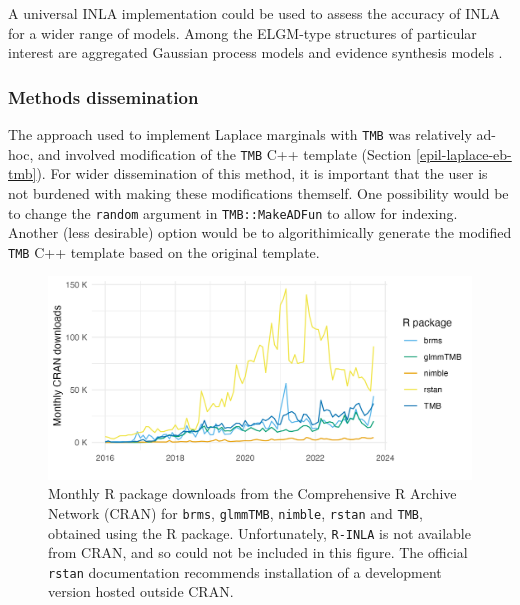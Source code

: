 \documentclass[a4paper, nobind]{templates/ociamthesis}
\begin{document}
A universal INLA implementation could be used to assess the accuracy of INLA for a wider range of models.
Among the ELGM-type structures of particular interest are aggregated Gaussian process models \autocite{nandi2023disaggregation} and evidence synthesis models \autocite{amoah2020geostatistical}.

\hypertarget{methods-dissemination}{%
\subsubsection{Methods dissemination}\label{methods-dissemination}}

The approach used to implement Laplace marginals with \texttt{TMB} was relatively ad-hoc, and involved modification of the \texttt{TMB} C++ template (Section \ref{epil-laplace-eb-tmb}).
For wider dissemination of this method, it is important that the user is not burdened with making these modifications themself.
One possibility would be to change the \texttt{random} argument in \texttt{TMB::MakeADFun} to allow for indexing.
Another (less desirable) option would be to algorithimically generate the modified \texttt{TMB} C++ template based on the original template.



\begin{figure}
\includegraphics[width=0.95\linewidth]{figures/naomi-aghq/package-downloads} \caption{Monthly R package downloads from the Comprehensive R Archive Network (CRAN) for \texttt{brms}, \texttt{glmmTMB}, \texttt{nimble}, \texttt{rstan} and \texttt{TMB}, obtained using the \textcite{cranlogs} R package. Unfortunately, \texttt{R-INLA} is not available from CRAN, and so could not be included in this figure. The official \texttt{rstan} documentation recommends installation of a development version hosted outside CRAN.}\label{fig:package-downloads}
\end{figure}
\end{document}
